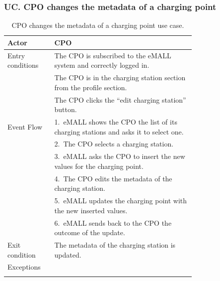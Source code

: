 \subsubsection*{UC\cuc . CPO changes the metadata of a charging point}
\begin{center}
    \begin{longtable}{lp{0.75\linewidth}}
        \hline
        Actor            & CPO                                                                                  \\
        \hline
        Entry conditions & The CPO is subscribed to the eMALL system and correctly logged in.                   \\
        & The CPO is in the charging station section from the profile section.                 \\
        & The CPO clicks the “edit charging station” button.                                   \\
        \hline
        Event Flow       & 1.\ eMALL shows the CPO the list of its charging stations and asks it to select one. \\
        & 2.\ The CPO selects a charging station.                                              \\
        & 3.\ eMALL asks the CPO to insert the new values for the charging point.              \\
        & 4.\ The CPO edits the metadata of the charging station.                              \\
        & 5.\ eMALL updates the charging point with the new inserted values.                   \\
        & 6.\ eMALL sends back to the CPO the outcome of the update.                           \\
        \hline
        Exit condition   & The metadata of the charging station is updated.                                     \\
        \hline
        Exceptions       &                                                                                      \\
        \hline
        \caption{CPO changes the metadata of a charging point use case.}
        \label{tab: CPO_updates_charging_point_use_case}
    \end{longtable}


\end{center}
